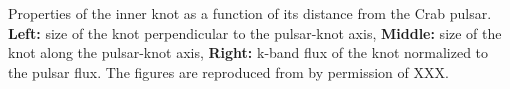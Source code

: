 \label{fig:knotcorr}
Properties of the inner knot as a function of its distance from the Crab pulsar. \textbf{Left:} size of the knot perpendicular to the pulsar-knot axis, \textbf{Middle:} size of the knot along the pulsar-knot axis, \textbf{Right:} k-band flux of the knot normalized to the pulsar flux. The figures are reproduced from \citet{rudy2015} by permission of XXX.